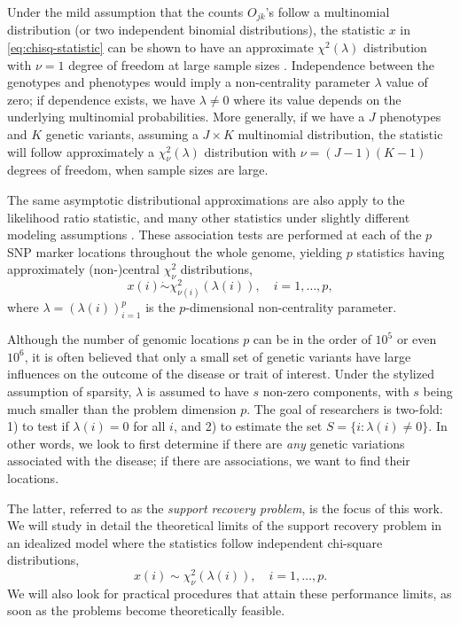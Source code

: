 Under the mild assumption that the counts $O_{jk}$'s follow a multinomial distribution (or two independent binomial distributions), the statistic $x$ in \eqref{eq:chisq-statistic} can be shown to have an approximate $\chi^2(\lambda)$ distribution with $\nu=1$ degree of freedom at large sample sizes \citep{agresti2018introduction}. 
Independence between the genotypes and phenotypes would imply a non-centrality parameter $\lambda$ value of zero; if dependence exists, we have $\lambda\neq0$ where its value depends on the underlying multinomial probabilities.
More generally, if we have a $J$ phenotypes and $K$ genetic variants, assuming a $J\times K$ multinomial distribution, the statistic will follow approximately a $\chi^2_{\nu}(\lambda)$ distribution with $\nu = (J-1)(K-1)$ degrees of freedom, when sample sizes are large.

The same asymptotic distributional approximations are also apply to the likelihood ratio statistic, and many other statistics under slightly different modeling assumptions \cite{gao2019upass}.
These association tests are performed at each of the $p$ SNP marker locations throughout the whole genome, yielding $p$ statistics having approximately (non-)central $\chi^2_{\nu}$ distributions,
\begin{equation} \label{eq:model-chisquare-approx}
    x(i) \mathrel{\dot\sim} \chi_{\nu(i)}^2\left(\lambda(i)\right), \quad i=1,\ldots,p,
\end{equation}
where $\lambda = (\lambda(i))_{i=1}^p$ is the $p$-dimensional non-centrality parameter.

Although the number of genomic locations $p$ can be in the order of $10^5$ or even $10^6$, it is often believed that only a small set of genetic variants have large influences on the outcome of the disease or trait of interest.
Under the stylized assumption of sparsity, $\lambda$ is assumed to have $s$ non-zero components, with $s$ being much smaller than the problem dimension $p$. 
The goal of researchers is two-fold: 1) to test if $\lambda(i)=0$ for all $i$, and 2) to estimate the set $S=\{i:\lambda(i)\neq 0\}$.
In other words, we look to first determine if there are \emph{any} genetic variations associated with the disease; if there are associations, we want to find their locations.

The latter, referred to as the \emph{support recovery problem}, is the focus of this work.
We will study in detail the theoretical limits of the support recovery problem in an idealized model where the statistics follow independent chi-square distributions,
\begin{equation} \label{eq:model-chisq}
    x(i) \sim \chi_\nu^2\left(\lambda(i)\right), \quad i=1,\ldots,p.
\end{equation}
We will also look for practical procedures that attain these performance limits, as soon as the problems become theoretically feasible.


